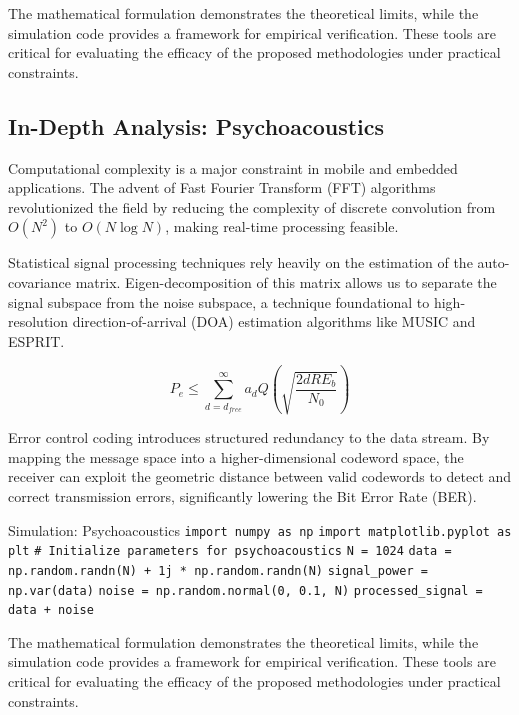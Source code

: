 \vspace{0.5cm}
The mathematical formulation demonstrates the theoretical limits, while the simulation code provides a framework for empirical verification. These tools are critical for evaluating the efficacy of the proposed methodologies under practical constraints.


\subsection{In-Depth Analysis: Psychoacoustics}
Computational complexity is a major constraint in mobile and embedded applications. The advent of Fast Fourier Transform (FFT) algorithms revolutionized the field by reducing the complexity of discrete convolution from $O(N^2)$ to $O(N \log N)$, making real-time processing feasible.

Statistical signal processing techniques rely heavily on the estimation of the auto-covariance matrix. Eigen-decomposition of this matrix allows us to separate the signal subspace from the noise subspace, a technique foundational to high-resolution direction-of-arrival (DOA) estimation algorithms like MUSIC and ESPRIT.

\begin{equation}
    P_e \leq \sum_{d=d_{free}}^{\infty} a_d Q\left(\sqrt{\frac{2 d R E_b}{N_0}}\right)
\end{equation}

Error control coding introduces structured redundancy to the data stream. By mapping the message space into a higher-dimensional codeword space, the receiver can exploit the geometric distance between valid codewords to detect and correct transmission errors, significantly lowering the Bit Error Rate (BER).

\begin{pythonbox}{Simulation: Psychoacoustics}
\texttt{import numpy as np}
\texttt{import matplotlib.pyplot as plt}
\texttt{}
\texttt{\# Initialize parameters for psychoacoustics}
\texttt{N = 1024}
\texttt{data = np.random.randn(N) + 1j * np.random.randn(N)}
\texttt{signal\_power = np.var(data)}
\texttt{noise = np.random.normal(0, 0.1, N)}
\texttt{processed\_signal = data + noise}
\end{pythonbox}

\vspace{0.5cm}
The mathematical formulation demonstrates the theoretical limits, while the simulation code provides a framework for empirical verification. These tools are critical for evaluating the efficacy of the proposed methodologies under practical constraints.


